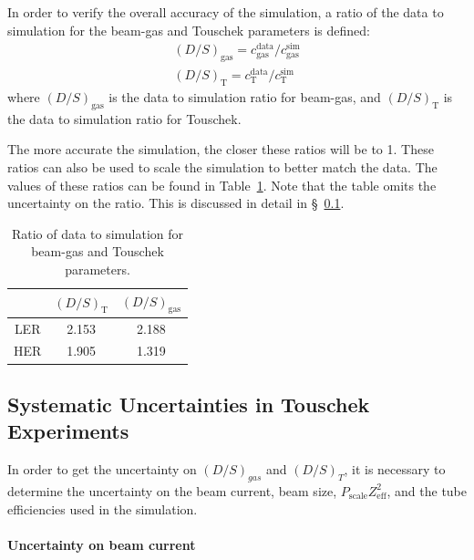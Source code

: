 	In order to verify the overall accuracy of the simulation, a ratio of the data to simulation for the beam-gas and Touschek parameters is defined:
\begin{subequations}
\begin{align}
		{(D/S)_{\mathrm{gas}} = c_{\mathrm{gas}}^{\mathrm{data}}/c_{\mathrm{gas}}^{\mathrm{sim}}} \\
		{(D/S)_{\mathrm{T}} = c_{\mathrm{T}}^{\mathrm{data}}/c_{\mathrm{T}}^{\mathrm{sim}}}
\end{align}
\end{subequations}
where $(D/S)_{\mathrm{gas}}$ is the data to simulation ratio for beam-gas, and $(D/S)_{\mathrm{T}}$ is the data to simulation ratio for Touschek.

The more accurate the simulation, the closer these ratios will be to 1. These ratios can also be used to scale the simulation to better match the data. The values of these ratios can be found in Table~\ref{tab:dataSimRatio}. Note that the table omits the uncertainty on the ratio. This is discussed in detail in \S~\ref{sec:Systematics}.

\begin{table}[htb]
	\centering
	\begin{tabular}{ ccc }
		& $(D/S)_{\mathrm{T}}$	&  $(D/S)_{\mathrm{gas}}$	\\ \hline \hline
	LER	& 2.153		& 2.188	\\ 
	HER	& 1.905		& 1.319	\\ \hline 
	\end{tabular}
	\caption[Ratio of data to simulation for beam-gas and Touschek parameters]{Ratio of data to simulation for beam-gas and Touschek parameters.}
	\label{tab:dataSimRatio}
\end{table}

\subsection{Systematic Uncertainties in Touschek Experiments}
\label{sec:Systematics}


	In order to get the uncertainty on $(D/S)_{gas}$ and $(D/S)_{T}$, it is necessary to determine the uncertainty on the beam current, beam size, $P_{\mathrm{scale}}Z_{\mathrm{eff}}^{2}$, and the \he tube efficiencies used in the simulation.

\paragraph{Uncertainty on beam current}
	
